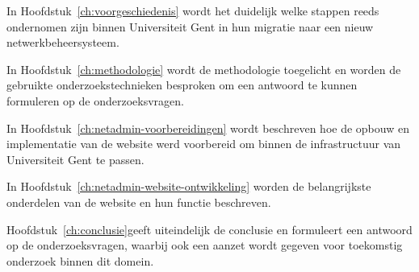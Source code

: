 In Hoofdstuk~\ref{ch:voorgeschiedenis} wordt het duidelijk welke stappen reeds ondernomen zijn binnen Universiteit Gent in hun migratie naar een nieuw netwerkbeheersysteem.

In Hoofdstuk~\ref{ch:methodologie} wordt de methodologie toegelicht en worden de gebruikte onderzoekstechnieken besproken om een antwoord te kunnen formuleren op de onderzoeksvragen.

In Hoofdstuk~\ref{ch:netadmin-voorbereidingen} wordt beschreven hoe de opbouw en implementatie van de website werd voorbereid om binnen de infrastructuur van Universiteit Gent te passen.

In Hoofdstuk~\ref{ch:netadmin-website-ontwikkeling} worden de belangrijkste onderdelen van de website en hun functie beschreven.

Hoofdstuk~\ref{ch:conclusie}geeft uiteindelijk de conclusie en formuleert een antwoord op de onderzoeksvragen, waarbij ook een aanzet wordt gegeven voor toekomstig onderzoek binnen dit domein.